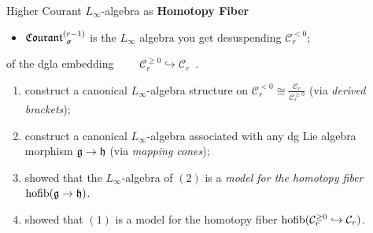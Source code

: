 \documentclass[beamer,10pt,handout]{standalone}  \Handouttrue
\begin{document}



\begin{frame}{Higher Courant $L_\infty$-algebra as \textbf{Homotopy Fiber}}
	\begin{itemize}
		\item $\Courant[\sigma]{r-1}$ is the $L_\infty$ algebra you get desuspending $\mathcal{C}_r^{<0}$;
	\end{itemize}
	\pause
	\vfill

	\begin{propblock} of the dgla embedding $\qquad \mathcal{C}_r^{\geq 0} \hookrightarrow \mathcal{C}_r$~.
	\end{propblock}
	\pause
	\begin{proofblock}
\begin{enumerate}[(1)]
		\item \cite{Getzler1991} construct a canonical $L_\infty$-algebra structure on $\mathcal{C}_r^{<0}\cong \frac{\mathcal{C}_r }{\mathcal{C}_r^{\geq 0}}$ (via \emph{derived brackets});
		\item \cite{Fiorenza2006} construct a canonical $L_\infty$-algebra associated with any dg Lie algebra morphism $\g \to \mathfrak{h}$ (via \emph{mapping cones});
		\item \cite{Pridham2010a} showed that the $L_\infty$-algebra  of $(2)$ is a \emph{model for the homotopy fiber $\hofib(\g \to \mathfrak{h})$}.
		\item \cite{Bandiera2015} showed that $(1)$ is a model for the homotopy fiber $\hofib(\mathcal{C}_r^{\geq 0} \hookrightarrow \mathcal{C}_r)$.
	\end{enumerate}
		\begin{flushright}
			\qedsymbol
		\end{flushright}
	\end{proofblock}
 
\end{frame}
\end{document}

